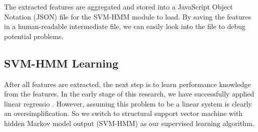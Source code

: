    The extracted features are aggregated and stored into a JavaScript Object Notation (JSON) file for the SVM-HMM module to load. By saving the features in a human-readable intermediate file, we can easily look into the file to debug potential problems.%


\subsection{SVM-HMM Learning}
After all features are extracted, the next step is to learn performance knowledge from the features. In the early stage of this research, we have successfully applied linear regressio \cite{Lyu2012}. However, assuming this problem to be a linear system is clearly an oversimplification. So we switch to structural support vector machine with hidden Markov model output (SVM-HMM)\cite{svm2009, svm2005, svm2003} as our supervised learning algorithm. 

